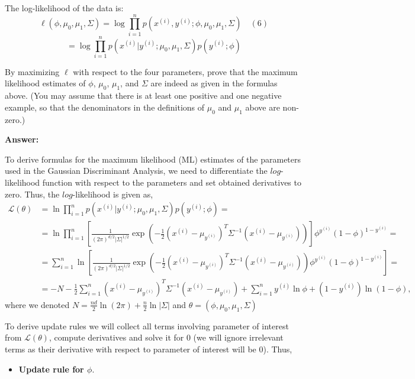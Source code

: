 \documentclass{article}
\begin{document}
\begin{enumerate}[label=\alph*)]
The log-likelihood of the data is:
\[ \ell(\phi, \mu_0, \mu_1, \Sigma) = \log \prod_{i=1}^{n} p(x^{(i)}, y^{(i)}; \phi, \mu_0, \mu_1, \Sigma) \quad (6) \]
\[ = \log \prod_{i=1}^{n} p(x^{(i)}|y^{(i)}; \mu_0, \mu_1, \Sigma) p(y^{(i)}; \phi) \]

By maximizing $\ell$ with respect to the four parameters, prove that the maximum likelihood estimates of $\phi$, $\mu_0$, $\mu_1$, and $\Sigma$ are indeed as given in the formulas above. (You may assume that there is at least one positive and one negative example, so that the denominators in the definitions of $\mu_0$ and $\mu_1$ above are non-zero.)

\textbf{Answer:}


To derive formulas for the maximum likelihood (ML) estimates of the parameters used in the Gaussian Discriminant Analysis, we need to differentiate the $log$-likelihood function with respect to the parameters and set obtained derivatives to zero. Thus, the
$log$-likelihood is given as,
\begin{align*}
    \mathscr{L}(\theta) &= \ln \prod_{i=1}^{n} p(x^{(i)}|y^{(i)}; \mu_0, \mu_1, \Sigma)p(y^{(i)}; \phi) =\\
    &=\ln\prod_{i=1}^{n} \left[\frac{1}{(2\pi)^{d/2}|\Sigma|^{1/2}}\exp\left(-\frac{1}{2}(x^{(i)}-\mu_{y^{(i)}})^T \Sigma^{-1}(x^{(i)}-\mu_{y^{(i)}})\right)\right] \phi^{y^{(i)}}(1-\phi)^{1-y^{(i)}}=\\
&=\sum_{i=1}^{n} \ln \left[\frac{1}{(2\pi)^{d/2}|\Sigma|^{1/2}}\exp\left(-\frac{1}{2}(x^{(i)}-\mu_{y^{(i)}})^T \Sigma^{-1}(x^{(i)}-\mu_{y^{(i)}})\right) \phi^{y^{(i)}}(1-\phi)^{1-y^{(i)}}\right]=\\
&=-N-\frac{1}{2}\sum_{i=1}^{n}(x^{(i)}-\mu_{y^{(i)}})^T\Sigma^{-1}(x^{(i)}-\mu_{y^{(i)}}) + \sum_{i=1}^{n} y^{(i)}\ln\phi + (1-y^{(i)})\ln(1-\phi),
\end{align*}
where we denoted $N=\frac{nd}{2}\ln(2\pi)+\frac{n}{2}\ln|\Sigma|$ and $\theta = (\phi, \mu_0, \mu_1, \Sigma)$

To derive update rules we will collect all terms involving parameter of interest from $\mathscr{L}(\theta)$, compute derivatives and solve it for 0 (we will ignore irrelevant terms as their derivative with respect to parameter of interest will be 0). Thus,
\begin{itemize} 
    \item \textbf{Update rule for $\phi$}.


\end{itemize}
\end{enumerate}
\end{document}

